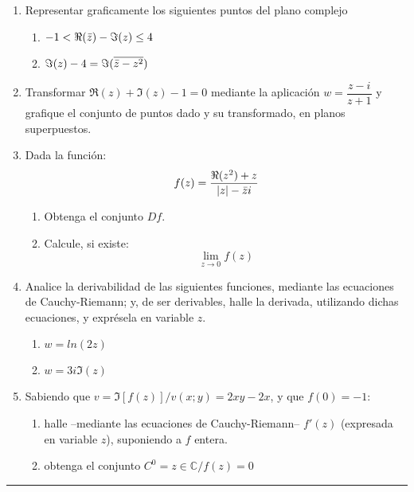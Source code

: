 \documentclass[9pt,a4paper]{extarticle}
\begin{document}
\begin{enumerate}
    \item Representar graficamente los siguientes puntos del plano complejo
    \begin{enumerate}
        \item $-1 < \Re(\Bar{z}) - \Im(z) \leq 4$
        \item $\Im(z) -4= \Im(\overline{ \Bar{z} - z^{2} })$
    \end{enumerate}
    \item Transformar $\Re(z)+\Im(z)-1=0$ mediante la aplicación $w=\dfrac{z-i}{z+1}$ y grafique el conjunto de puntos dado y su transformado, en planos superpuestos.
    \item Dada la función: $$f(z)= \dfrac{ \Re(z^2)+z}{|z|-\Bar{z}i}$$
    \begin{enumerate}
        \item Obtenga el conjunto $Df$.
        \item Calcule, si existe: $$\lim_{z \to 0} f(z)$$
    \end{enumerate}
    \item Analice la derivabilidad de las siguientes funciones, mediante las ecuaciones de Cauchy-Riemann; y, de ser derivables, halle la derivada, utilizando dichas ecuaciones, y exprésela en variable $z$.
    \begin{enumerate}
        \item $w=ln(2z)$
        \item $w=3i\Im(z)$
    \end{enumerate}
    \item Sabiendo que $v=\Im[f(z)]/v(x;y)=2xy-2x$, y que $f(0) = -1$: 
    \begin{enumerate}
        \item halle --mediante las ecuaciones de Cauchy-Riemann-- $f'(z)$ (expresada en variable $z$), suponiendo a $f$ entera.
        \item obtenga el conjunto $C^0 = {z \in \mathbb{C} / f(z)=0}$
    \end{enumerate}
\end{enumerate}
\hrule
\end{document}
